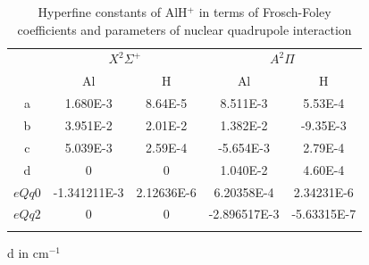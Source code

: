 \documentclass[nofootinbib,aip,jcp,reprint]{revtex4-1}
\begin{document}
\begin{center}
\begin{table}[htbp!]
\let\TPToverlap=\TPTrlap
\caption{Hyperfine constants of AlH$^{+}$ in terms of Frosch-Foley coefficients and parameters of nuclear quadrupole interaction}
\renewcommand{\arraystretch}{1.5}
\begin{threeparttable}
\setlength{\tabcolsep}{6pt}
\begin{tabular}{*{5}{c}}
\hline\colrule
\multirow{2}{*}{Constant} &\multicolumn{2}{c}{$X^2\Sigma^+$} &\multicolumn{2}{c}{$A^2\Pi$} \\
\cline {2-5}
&Al &H  &Al &H\\
 \hline\colrule
a               &\num{1.680E-3}           &\num{8.64E-5}            &\num{8.511E-3}              &\num{5.53E-4}         \\
b               &\num{3.951E-2}           &\num{2.01E-2}             &\num{1.382E-2}             &\num{-9.35E-3}         \\
c               &\num{5.039E-3}          &\num{2.59E-4}             &\num{-5.654E-3}            &\num{2.79E-4}         \\
d               &\num{0}                        &\num{0}                         &\num{1.040E-2}             &\num{4.60E-4}          \\
$eQq0$    &\num{-1.341211E-3}    &\num{2.12636E-6}        &\num{6.20358E-4}       &\num{2.34231E-6}      \\
$eQq2$    &\num{0}                        &\num{0}                          &\num{-2.896517E-3}    &\num{-5.63315E-7}     \\               
\botrule
\end{tabular}
\begin{tablenotes}
\item[d] in cm$^{-1}$
\end{tablenotes}
\end{threeparttable}
\label{hyperfineconstant}
\end{table}
\end{center}
\end{document}

